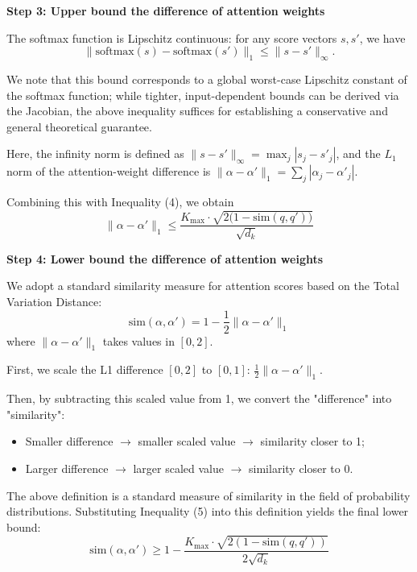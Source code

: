 \documentclass[11pt]{article}
\begin{document}
\textbf{Step 3: Upper bound the difference of attention weights}

The softmax function is Lipschitz continuous: for any score vectors $s, s'$, we have  
$$
\lVert \text{softmax}(s) - \text{softmax}(s') \rVert_1
\le
\lVert s - s' \rVert_\infty .
$$

We note that this bound corresponds to a global worst-case Lipschitz constant of the softmax function; while tighter, input-dependent bounds can be derived via the Jacobian, the above inequality suffices for establishing a conservative and general theoretical guarantee.


Here, the infinity norm is defined as  
$\lVert s - s' \rVert_\infty = \max_j |s_j - s'_j|$,  
and the $L_1$ norm of the attention-weight difference is  
$\lVert \alpha - \alpha' \rVert_1 = \sum_j |\alpha_j - \alpha'_j|$.

Combining this with Inequality (4), we obtain  
\begin{equation}
\lVert \alpha - \alpha' \rVert_1
\le
\frac{K_{\max} \cdot \sqrt{2\bigl(1-\mathrm{sim}(q,q')\bigr)}}{\sqrt{d_k}}
\tag{5}
\end{equation}

\textbf{Step 4: Lower bound the difference of attention weights}

We adopt a standard similarity measure for attention scores based on the Total Variation Distance:  
$$
\text{sim}(\alpha, \alpha') = 1 - \frac{1}{2} \| \alpha - \alpha' \|_1
$$  
where $\| \alpha - \alpha' \|_1$ takes values in $[0, 2]$. 

First, we scale the L1 difference $[0, 2]$ to $[0, 1]$: $\frac{1}{2} \|\alpha - \alpha'\|_1$. 

Then, by subtracting this scaled value from 1, we convert the "difference" into "similarity":  
\begin{itemize}
    \item Smaller difference $\to$ smaller scaled value $\to$ similarity closer to 1;
    \item Larger difference $\to$ larger scaled value $\to$ similarity closer to 0.
\end{itemize}

The above definition is a standard measure of similarity in the field of probability distributions. Substituting Inequality (5) into this definition yields the final lower bound:  
\begin{equation}
\text{sim}(\alpha, \alpha') \ge 1 - \frac{
K_{\text{max}} \cdot \sqrt{2(1 - \text{sim}(q, q'))}
}{
2 \sqrt{d_k}
} \tag{6}
\end{equation}
\end{document}
